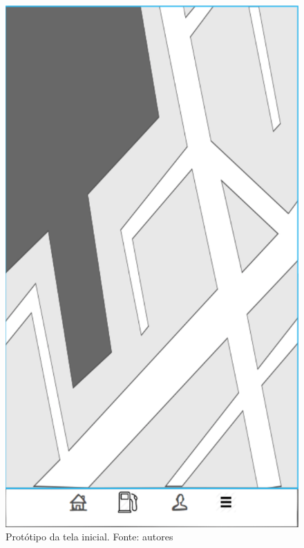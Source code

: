 \begin{figure}[H]
    \centering
    \includegraphics[scale=0.5]{figuras/prototipo_mapa.png}
    \caption[Protótipo da tela inicial]{Protótipo da tela inicial. Fonte: autores}
    \label{img:prototipo_tela_inicial}
\end{figure}